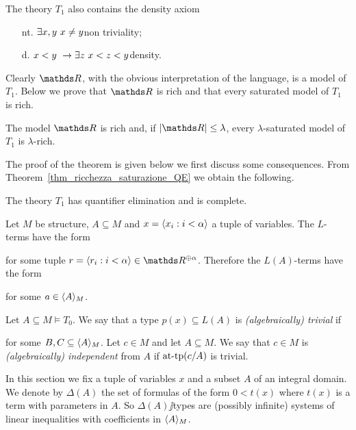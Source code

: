 \documentclass[creche.tex]{subfiles}
\begin{document}
The theory \emph{$T_1$\/} also contains the density axiom 

\begin{itemize}
\item[nt.]$\exists x,y\ x\neq y$\hfill non triviality;
\item[d.] $x<y\ \imp \E z\ x<z<y$\hfill density.
\end{itemize}

Clearly $\RR$, with the obvious interpretation of the language, is a model of $T_1$. Below we prove that $\RR$ is rich and that every saturated model of $T_1$ is rich.

\begin{theorem}
The model $\RR$ is rich and, if $|\RR|\le\lambda$, every $\lambda$-saturated model of $T_1$ is $\lambda$-rich.
\end{theorem}



The proof of the theorem is given below we first discuss some consequences. From Theorem~\ref{thm_ricchezza_saturazione_QE} we obtain the following.

\begin{corollary}
The theory $T_1$ has quantifier elimination and is complete.
\end{corollary}

Let $M$ be structure, $A\subseteq M$ and $x=\langle x_i:i<\alpha\rangle$ a tuple of variables. The $L$-terms have the form 


for some tuple $r=\<r_i:i<\alpha\>\in\RR^{\oplus\alpha}$. Therefore the $L(A)$-terms have the form 


for some $a\in\langle A\rangle_M$. 

Let $A\subseteq M\models T_0$. We say that a type $p(x)\subseteq L(A)$ is \emph{(algebraically) trivial\/} if 


for some $B,C\subseteq\langle A\rangle_M$. Let $c\in M$ and let $A\subseteq M$. We say that $c\in M$ is \emph{(algebraically) independent\/} from $A$ if $\textrm{at\mbox{-}tp}(c/A)$ is trivial.  


In this section we fix a tuple of variables \emph{$x$\/} and a subset \emph{$A$} of an integral domain. We denote by \emph{$\Delta(A)$\/} the set of formulas of the form $0<t(x)$ where $t(x)$ is a term with parameters in $A$. So $\Delta(A)\jj$types are (possibly infinite) systems of linear inequalities with coefficients in $\langle A\rangle_M$. 
\end{document}
